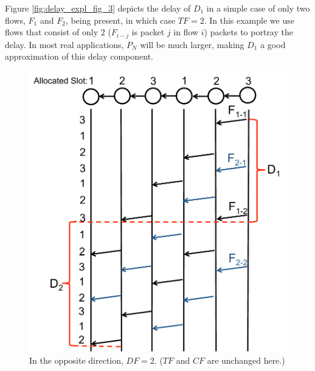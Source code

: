 Figure \ref{fig:delay_expl_fig_3} depicts the delay of $D_1$ in a simple case of only two flows, $F_1$ and $F_2$, being present, in which case $TF = 2$.  In this example we use flows that consist of only $2$ ($F_{i-j}$ is packet $j$ in flow $i$) packets to portray the delay.  In most real applications, $P_N$ will be much larger, making $D_1$ a good approximation of this delay component.

\begin{figure}
\begin{centering}
    \includegraphics[scale=0.35]{figures/delay_limit_expl/fig_2_2.pdf}
    \caption{In the opposite direction, $DF = 2$. ($TF$ and $CF$ are unchanged here.)}
    \label{fig:delay_expl_fig_4}
\end{centering}
\end{figure}


